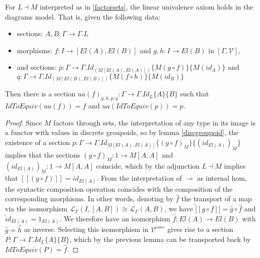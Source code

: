   \begin{thm}
    For $L \dashv M$ interpreted as in \ref{factorsets}, the linear univalence axiom holds in the diagrams model. That is, given the following data:
    \begin{itemize}
    \item sections: $A, B : \Gamma \to \Gamma.L$
    \item morphisms: $f : I \to [El(A), El(B)]$ and $g, h : I \to El(B)$ in $[\Gamma, \mathcal{V}]$,
    \item and sections: $p : \Gamma \to \Gamma.Id_{(M[El(A),El(A)])}\{M(g \circ f)\}\{M(id_A)\}$ and $q : \Gamma \to \Gamma.Id_{(M[El(B),El(B)])}\{M(f \circ h)\}\{M(id_B)\}$
    \end{itemize}
    Then there is a section $ua(f)_{g, h, p, q} : \Gamma \to \Gamma.Id_L\{A\}\{B\}$ such that $IdToEquiv(ua(f)) = f$ and $ua(IdToEquiv(p)) = p$.
    \begin{proof}
      Since $M$ factors through sets, the interpretation of any type in its image is a functor with values in discrete groupoids, so by lemma \ref{discgroupoid}, the existence of a section $p : \Gamma \to \Gamma.Id_{M[El(A), El(A)]}\{(g \circ f)_M\}\{(id_{El(A)})_M\}$ implies that the sections $(g \circ f)_M : 1 \to M[A, A]$ and $(id_{El(A)})_M : 1 \to M[A,A]$ coincide, which by the adjunction $L \dashv M$ implies that $[[(g \circ f)]] = id_{El(A)}$. From the interpretation of $\multimap$ as internal hom, the syntactic composition operation coincides with the composition of the corresponding morphisms. In other words, denoting by $\hat f$ the transport of a map via the isomorphism $\mathcal{L}_\Gamma(I, [A,B]) \cong \mathcal{L}_\Gamma(A,B)$, we have $\hat [[g \circ f]] = \hat g \circ \hat f$ and $\hat id_{El(A)} = 1_{El(A)}$. We therefore have an isomorphism $\hat f : El(A) \to El(B)$ with $\hat g = \hat h$ as inverse. Selecting this isomorphism in $\mathcal{V}^{core}$ gives rise to a section $P : \Gamma \to \Gamma.Id_L\{A\}\{B\}$, which by the previous lemma can be transported back by $IdToEquiv(P) = \hat f$.
\end{proof}
\end{thm}
